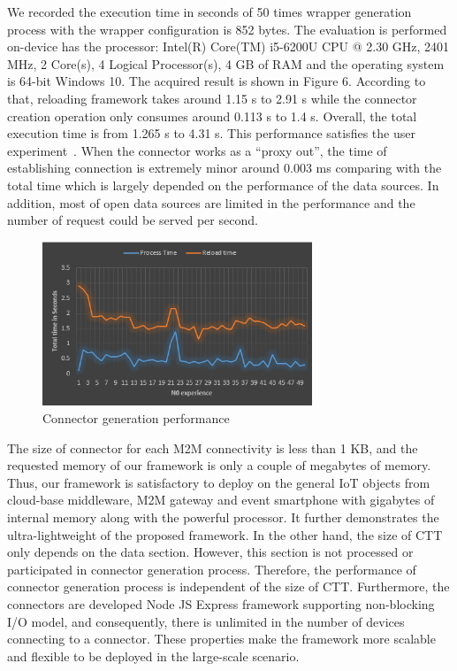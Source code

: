 We recorded the execution time in seconds of 50 times wrapper generation process with the wrapper configuration is 852 bytes. The evaluation is performed on-device has the processor: Intel(R) Core(TM) i5-6200U CPU @ 2.30 GHz, 2401 MHz, 2 Core(s), 4 Logical Processor(s), 4 GB of RAM and the operating system is 64-bit Windows 10. The acquired result is shown in Figure 6. According to that, reloading framework takes around 1.15 s to 2.91 s while the connector creation operation only consumes around 0.113 s to 1.4 s. Overall, the total execution time is from 1.265 s to 4.31 s. This performance satisfies the user experiment~\cite{rosson2002usability}. When the connector works as a ``proxy out'', the time of establishing connection is extremely minor around 0.003 ms comparing with the total time which is largely depended on the performance of the data sources. In addition, most of open data sources are limited in the performance and the number of request could be served per second. \\

\begin{figure}[h!] 
 \begin{center} 
 \includegraphics[width=0.72\textwidth]{./Part2/Chapter4/figures/connector_performance.png} 
    \caption{Connector generation performance}
     \label{fig:c4_connector_performance}
  \end{center} 
\end{figure}

The size of connector for each M2M connectivity is less than 1 KB, and the requested memory of our framework is only a couple of megabytes of memory. Thus, our framework is satisfactory to deploy on the general IoT objects from cloud-base middleware, M2M gateway and event smartphone with gigabytes of internal memory along with the powerful processor. It further demonstrates the ultra-lightweight of the proposed framework. In the other hand, the size of CTT only depends on the data section. However, this section is not processed or participated in connector generation process. Therefore, the performance of connector generation process is independent of the size of CTT. Furthermore, the connectors are developed Node JS Express framework  supporting non-blocking I/O model, and consequently, there is unlimited in the number of devices connecting to a connector. These properties make the framework more scalable and flexible to be deployed in the large-scale scenario.

